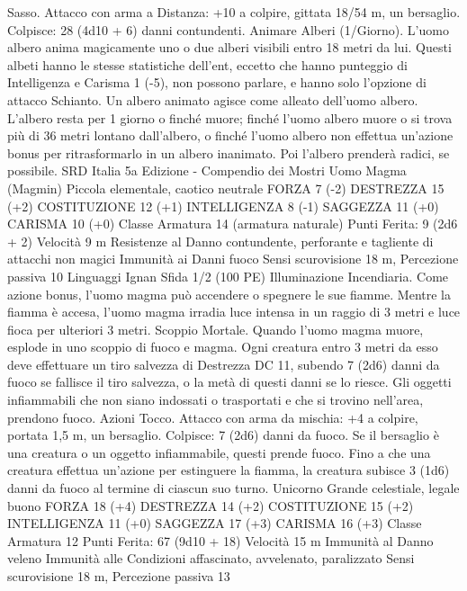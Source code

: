 \begin{multicols}{2}
Sasso. Attacco con arma a Distanza: +10 a colpire, gittata 18/54
m, un bersaglio.
Colpisce: 28 (4d10 + 6) danni contundenti.
Animare Alberi (1/Giorno). L’uomo albero anima magicamente
uno o due alberi visibili entro 18 metri da lui. Questi albeti hanno
le stesse statistiche dell’ent, eccetto che hanno punteggio di
Intelligenza e Carisma 1 (-5), non possono parlare, e hanno solo
l’opzione di attacco Schianto. Un albero animato agisce come
alleato dell’uomo albero. L’albero resta per 1 giorno o finché
muore; finché l’uomo albero muore o si trova più di 36 metri
lontano dall’albero, o finché l’uomo albero non effettua
un’azione bonus per ritrasformarlo in un albero inanimato. Poi
l’albero prenderà radici, se possibile.
SRD Italia 5a Edizione - Compendio dei Mostri
Uomo Magma
(Magmin)
Piccola elementale, caotico neutrale
FORZA 7 (-2)
DESTREZZA 15 (+2)
COSTITUZIONE 12 (+1)
INTELLIGENZA 8 (-1)
SAGGEZZA 11 (+0)
CARISMA 10 (+0)
Classe Armatura 14 (armatura naturale)
\hspace*{0pt}\hfill{Punti Ferita}: 9 (2d6 + 2)
Velocità 9 m
Resistenze al Danno contundente, perforante e tagliente di
attacchi non magici
Immunità ai Danni fuoco
Sensi scurovisione 18 m, Percezione passiva 10
Linguaggi Ignan
Sfida 1/2 (100 PE)
Illuminazione Incendiaria. Come azione bonus, l’uomo magma
può accendere o spegnere le sue fiamme. Mentre la fiamma è
accesa, l’uomo magma irradia luce intensa in un raggio di 3
metri e luce fioca per ulteriori 3 metri.
Scoppio Mortale. Quando l’uomo magma muore, esplode in uno
scoppio di fuoco e magma. Ogni creatura entro 3 metri da esso
deve effettuare un tiro salvezza di Destrezza DC 11, subendo 7
(2d6) danni da fuoco se fallisce il tiro salvezza, o la metà di
questi danni se lo riesce. Gli oggetti infiammabili che non siano
indossati o trasportati e che si trovino nell’area, prendono fuoco.
Azioni
Tocco. Attacco con arma da mischia: +4 a colpire, portata 1,5 m,
un bersaglio.
Colpisce: 7 (2d6) danni da fuoco. Se il bersaglio è una creatura o
un oggetto infiammabile, questi prende fuoco. Fino a che una
creatura effettua un’azione per estinguere la fiamma, la creatura
subisce 3 (1d6) danni da fuoco al termine di ciascun suo turno.
Unicorno
Grande celestiale, legale buono
FORZA 18 (+4)
DESTREZZA 14 (+2)
COSTITUZIONE 15 (+2)
INTELLIGENZA 11 (+0)
SAGGEZZA 17 (+3)
CARISMA 16 (+3)
Classe Armatura 12
\hspace*{0pt}\hfill{Punti Ferita}: 67 (9d10 + 18)
Velocità 15 m
Immunità al Danno veleno
Immunità alle Condizioni affascinato, avvelenato, paralizzato
Sensi scurovisione 18 m, Percezione passiva 13

\end{multicols}
